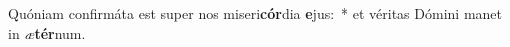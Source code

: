 \item Quóniam confirmáta est super nos miseri\textbf{cór}dia \textbf{e}jus:~* et véritas Dómini manet in \textit{æ}\textbf{tér}num.
